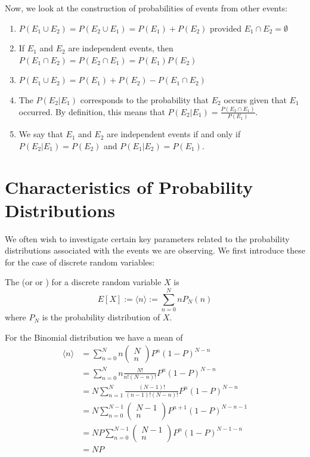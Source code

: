 \documentclass[12pt, a4paper, oneside, openright, titlepage]{book}
\begin{document}
Now, we look at the construction of probabilities of events from other events: \begin{enumerate}[label=\roman*]
    \item $P(E_1\cup E_2) = P(E_2 \cup E_1) = P(E_1)+P(E_2)$ provided $E_1\cap E_2 = \emptyset$
    \item If $E_1$ and $E_2$ are independent events, then $P(E_1\cap E_2) = P(E_2\cap E_1) = P(E_1)P(E_2)$
    \item $P(E_1\cup E_2) = P(E_1) + P(E_2) - P(E_1\cap E_2)$
    \item The  $P(E_2\vert E_1)$ corresponds to the probability that $E_2$ occurs given that $E_1$ occurred. By definition, this means that $P(E_2\vert E_1) = \frac{P(E_2\cap E_1)}{P(E_1)}$.
    \item We say that $E_1$ and $E_2$ are independent events if and only if $P(E_2\vert E_1) = P(E_2)$ and $P(E_1\vert E_2) = P(E_1)$.
\end{enumerate}


\section{Characteristics of Probability Distributions}

We often wish to investigate certain key parameters related to the probability distributions associated with the events we are observing. We first introduce these for the case of discrete random variables:

\begin{defn}
    The  (or  or ) for a discrete random variable $X$ is \begin{equation*}
        E[X] := \langle n \rangle := \sum_{n=0}^NnP_N(n)
    \end{equation*}
    where $P_N$ is the probability distribution of $X$.
\end{defn}
For the Binomial distribution we have a mean of \begin{align*}
    \langle n \rangle &= \sum_{n=0}^Nn\begin{pmatrix} N \\ n\end{pmatrix} P^n(1-P)^{N-n} \\
    &= \sum_{n=0}^Nn\frac{N!}{n!(N-n)!}P^n(1-P)^{N-n} \\
    &= N\sum_{n=1}^N\frac{(N-1)!}{(n-1)!(N-n)!}P^n(1-P)^{N-n} \\
    &= N\sum_{n=0}^{N-1}\begin{pmatrix} N-1 \\ n\end{pmatrix} P^{n+1}(1-P)^{N-n-1} \\
    &= NP\sum_{n=0}^{N-1}\begin{pmatrix} N-1 \\ n\end{pmatrix} P^{n}(1-P)^{N-1-n} \\
    &= NP
\end{align*}
\end{document}

